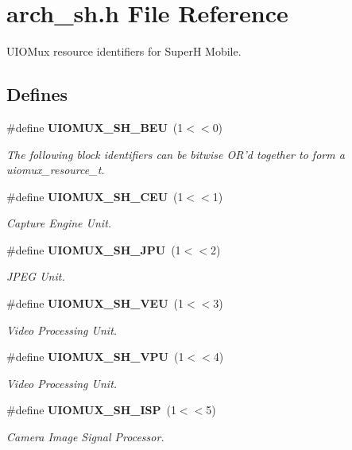 \section{arch\_\-sh.h File Reference}
\label{arch__sh_8h}


UIOMux resource identifiers for SuperH Mobile.  


\subsection*{Defines}
\begin{DoxyCompactItemize}
\item 
\#define {\bf UIOMUX\_\-SH\_\-BEU}~(1$<$$<$0)
\begin{DoxyCompactList}\small\item\em The following block identifiers can be bitwise OR'd together to form a {\itshape uiomux\_\-resource\_\-t\/}. \item\end{DoxyCompactList}\item 
\#define {\bf UIOMUX\_\-SH\_\-CEU}~(1$<$$<$1)\label{arch__sh_8h_a193a26db3caf26c950fd64db3d0dec18}

\begin{DoxyCompactList}\small\item\em Capture Engine Unit. \item\end{DoxyCompactList}\item 
\#define {\bf UIOMUX\_\-SH\_\-JPU}~(1$<$$<$2)\label{arch__sh_8h_abc401bc0bb3781a9a3ad67acd0db02a3}

\begin{DoxyCompactList}\small\item\em JPEG Unit. \item\end{DoxyCompactList}\item 
\#define {\bf UIOMUX\_\-SH\_\-VEU}~(1$<$$<$3)\label{arch__sh_8h_a05df73a31b0376b82353091150f6bfe8}

\begin{DoxyCompactList}\small\item\em Video Processing Unit. \item\end{DoxyCompactList}\item 
\#define {\bf UIOMUX\_\-SH\_\-VPU}~(1$<$$<$4)\label{arch__sh_8h_a0c5ad36f69ab0512fd32ff2321996696}

\begin{DoxyCompactList}\small\item\em Video Processing Unit. \item\end{DoxyCompactList}\item 
\#define {\bf UIOMUX\_\-SH\_\-ISP}~(1$<$$<$5)\label{arch__sh_8h_a96d2be203739f822e858863c36cca5d0}

\begin{DoxyCompactList}\small\item\em Camera Image Signal Processor. \item\end{DoxyCompactList}\end{DoxyCompactItemize}


